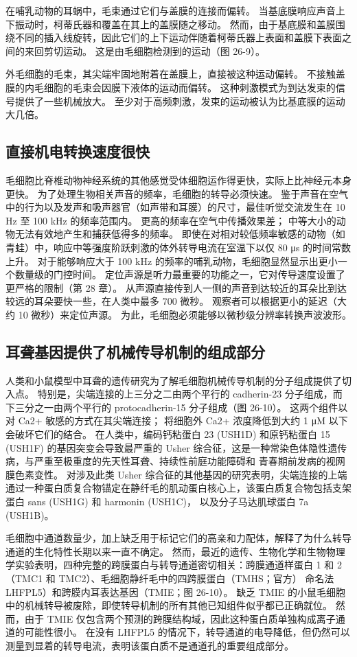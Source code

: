 在哺乳动物的耳蜗中，毛束通过它们与盖膜的连接而偏转。 当基底膜响应声音上下振动时，柯蒂氏器和覆盖在其上的盖膜随之移动。 然而，由于基底膜和盖膜围绕不同的插入线旋转，因此它们的上下运动伴随着柯蒂氏器上表面和盖膜下表面之间的来回剪切运动。 这是由毛细胞检测到的运动（图 26-9）。

外毛细胞的毛束，其尖端牢固地附着在盖膜上，直接被这种运动偏转。 不接触盖膜的内毛细胞的毛束会因膜下液体的运动而偏转。 这种刺激模式为到达发束的信号提供了一些机械放大。 至少对于高频刺激，发束的运动被认为比基底膜的运动大几倍。

\subsection{直接机电转换速度很快}
毛细胞比脊椎动物神经系统的其他感觉受体细胞运作得更快，实际上比神经元本身更快。 为了处理生物相关声音的频率，毛细胞的转导必须快速。 鉴于声音在空气中的行为以及发声和吸声器官（如声带和耳膜）的尺寸，最佳听觉交流发生在 10 Hz 至 100 kHz 的频率范围内。 更高的频率在空气中传播效果差； 中等大小的动物无法有效地产生和捕获低得多的频率。 即使在对相对较低频率敏感的动物（如青蛙）中，响应中等强度阶跃刺激的体外转导电流在室温下以仅 80 μs 的时间常数上升。 对于能够响应大于 100 kHz 的频率的哺乳动物，毛细胞显然显示出更小一个数量级的门控时间。 定位声源是听力最重要的功能之一，它对传导速度设置了更严格的限制（第 28 章）。 从声源直接传到人一侧的声音到达较近的耳朵比到达较远的耳朵要快一些，在人类中最多 700 微秒。 观察者可以根据更小的延迟（大约 10 微秒）来定位声源。 为此，毛细胞必须能够以微秒级分辨率转换声波波形。

\subsection{耳聋基因提供了机械传导机制的组成部分}
人类和小鼠模型中耳聋的遗传研究为了解毛细胞机械传导机制的分子组成提供了切入点。 特别是，尖端连接的上三分之二由两个平行的 cadherin-23 分子组成，而下三分之一由两个平行的 protocadherin-15 分子组成（图 26-10）。 这两个组件以对 Ca2+ 敏感的方式在其尖端连接； 将细胞外 Ca2+ 浓度降低到大约 1 μM 以下会破坏它们的结合。 在人类中，编码钙粘蛋白 23 (USH1D) 和原钙粘蛋白 15 (USH1F) 的基因突变会导致最严重的 Usher 综合征，这是一种常染色体隐性遗传病，与严重至极重度的先天性耳聋、持续性前庭功能障碍和 青春期前发病的视网膜色素变性。 对涉及此类 Usher 综合征的其他基因的研究表明，尖端连接的上端通过一种蛋白质复合物锚定在静纤毛的肌动蛋白核心上，该蛋白质复合物包括支架蛋白 sans (USH1G) 和 harmonin (USH1C)， 以及分子马达肌球蛋白 7a (USH1B)。

毛细胞中通道数量少，加上缺乏用于标记它们的高亲和力配体，解释了为什么转导通道的生化特性长期以来一直不确定。 然而，最近的遗传、生物化学和生物物理学实验表明，四种完整的跨膜蛋白与转导通道密切相关：跨膜通道样蛋白 1 和 2（TMC1 和 TMC2）、毛细胞静纤毛中的四跨膜蛋白（TMHS；官方） 命名法 LHFPL5）和跨膜内耳表达基因（TMIE；图 26-10）。 缺乏 TMIE 的小鼠毛细胞中的机械转导被废除，即使转导机制的所有其他已知组件似乎都已正确就位。 然而，由于 TMIE 仅包含两个预测的跨膜结构域，因此这种蛋白质单独构成离子通道的可能性很小。 在没有 LHFPL5 的情况下，转导通道的电导降低，但仍然可以测量到显着的转导电流，表明该蛋白质不是通道孔的重要组成部分。

